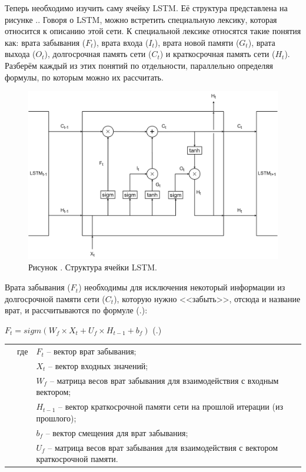 {  \par \redline Теперь необходимо изучить саму ячейку LSTM. Её структура представлена на рисунке \thechaptercntr .\theimagecntr. Говоря о LSTM, можно встретить специальную лексику, которая относится к описанию этой сети. К специальной лексике относятся такие понятия как: врата забывания ($F_t$), врата входа ($I_t$), врата новой памяти ($G_t$), врата выхода ($O_t$), долгосрочная память сети ($C_t$) и краткосрочная память сети ($H_t$). Разберём каждый из этих понятий по отдельности, параллельно определяя формулы, по которым можно их рассчитать.

  \begin{figure}
    \centering
    \def\svgwidth{\textwidth}
    \includegraphics[scale=0.225]{../GMs/Pl3/LSTM.png}
    \caption*{\gostFont Рисунок \thechaptercntr .\theimagecntr \spc {--} Структура ячейки LSTM.}
    \label{fig:LSTM}
  \end{figure} \addtocounter{imagecntr}{1}

  \par \redline Врата забывания ($F_t$) необходимы для исключения некоторый информации из долгосрочной памяти сети ($C_t$), которую нужно <<забыть>>, отсюда и название врат, и рассчитываются по формуле (\thechaptercntr .\theformulacntr):

  \formulaspace \par \redline 
    $F_t = sigm(W_f \times X_t + U_f \times H_{t-1} + b_f)$
    \hfill (\thechaptercntr .\theformulacntr) \redline
  \formulaspace \addtocounter{formulacntr}{1}

  \begin{tabular}{p{}p{}p{}}
		& где  & $F_t$ {--} вектор врат забывания; \\
    & 	   & $X_t$ {--} вектор входных значений; \\
		& 	   & $W_f$ {--} матрица весов врат забывания для взаимодействия с входным вектором; \\
    & 	   & $H_{t-1}$ {--} вектор краткосрочной памяти сети на прошлой итерации (из прошлого); \\
    & 	   & $b_f$ {--} вектор смещения для врат забывания; \\
    & 	   & $U_f$ {--} матрица весов врат забывания для взаимодействия с вектором краткосрочной памяти. \\
  \end{tabular}

}

